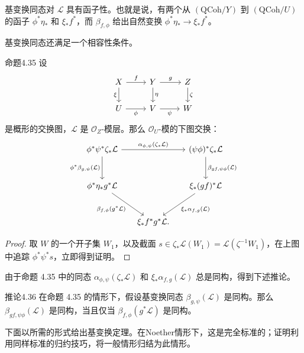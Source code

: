 基变换同态对 $\mathcal L$ 具有函子性。也就是说，有两个从 $(\mathrm{QCoh}/Y)$ 到 $(\mathrm{QCoh}/U)$ 的函子 $\phi^*\eta_*$ 和 $\xi_*f^*$，而 $\beta_{f,\phi}$ 给出自然变换 $\phi^*\eta_*\to\xi_*f^*$。

基变换同态还满足一个相容性条件。

\begin{origstatement}{命题}{4.35}\label{ch04:prop435}
设
\[
\begin{tikzcd}
 X\arrow[r,"{f}"]\arrow[d,"{\xi}"']&Y\arrow[r,"{g}"]\arrow[d,"{\eta}"]&Z\arrow[d,"{\zeta}"]\\
 U\arrow[r,"{\phi}"']&V\arrow[r,"{\psi}"']&W
\end{tikzcd}
\]
是概形的交换图，$\mathcal L$ 是 $\mathcal O_Z$-模层。那么 $\mathcal O_U$-模的下图交换：
\[
\begin{tikzcd}[column sep=1.5em,row sep=large]
 \phi^*\psi^*\zeta_*\mathcal L\arrow[rr,"{\alpha_{\phi,\psi}(\zeta_*\mathcal L)}"]\arrow[d,"{\phi^*\beta_{g,\psi}(\mathcal L)}"']&& (\psi\phi)^*\zeta_*\mathcal L\arrow[d,"{\beta_{gf,\psi\phi}(\mathcal L)}"]\\
 \phi^*\eta_*g^*\mathcal L\arrow[dr,"{\beta_{f,\phi}(g^*\mathcal L)}"']&&\xi_*(gf)^*\mathcal L\arrow[dl,"{\xi_*\alpha_{f,g}(\mathcal L)}"]\\
 &\xi_*f^*g^*\mathcal L.
\end{tikzcd}
\]
\end{origstatement}
\begin{proof}
取 $W$ 的一个开子集 $W_1$，以及截面 $s\in\zeta_*\mathcal L(W_1)=\mathcal L(\zeta^{-1}W_1)$，在上图中追踪 $\phi^*\psi^*s$，立即得到证明。
\end{proof}

由于命题 4.35 中的同态 $\alpha_{\phi,\psi}(\zeta_*\mathcal L)$ 和 $\xi_*\alpha_{f,g}(\mathcal L)$ 总是同构，得到下述推论。

\begin{origstatement}{推论}{4.36}\label{ch04:cor436}
在命题 4.35 的情形下，假设基变换同态 $\beta_{g,\psi}(\mathcal L)$ 是同构。那么 $\beta_{gf,\psi\phi}(\mathcal L)$ 是同构，当且仅当 $\beta_{f,\phi}(g^*\mathcal L)$ 是同构。
\end{origstatement}

下面以所需的形式给出基变换定理。在Noether情形下，这是完全标准的；证明利用同样标准的归约技巧，将一般情形归结为此情形。

